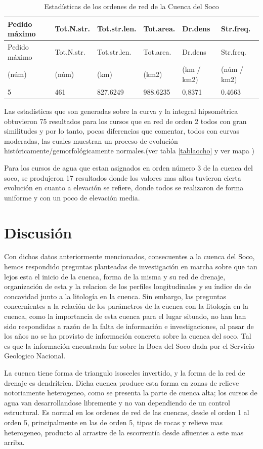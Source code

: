 \documentclass[11pt,]{article}
\begin{document}
\begin{longtable}[]{@{}llllll@{}}
\caption{\label{tablauno} Estadísticas de los ordenes de red de la
Cuenca del Soco}\tabularnewline
\toprule
Pedido máximo & Tot.N.str. & Tot.str.len. & Tot.area. & Dr.dens &
Str.freq.\tabularnewline
\midrule
\endfirsthead
\toprule
Pedido máximo & Tot.N.str. & Tot.str.len. & Tot.area. & Dr.dens &
Str.freq.\tabularnewline
\midrule
\endhead
(núm) & (núm) & (km) & (km2) & (km / km2) & (núm / km2)\tabularnewline
5 & 461 & 827.6249 & 988.6235 & 0,8371 & 0.4663\tabularnewline
\bottomrule
\end{longtable}

Las estadísticas que son generadas sobre la curva y la integral
hipsométrica obtuvieron 75 resultados para los cursos que en red de
orden 2 todos con gran similitudes y por lo tanto, pocas diferencias que
comentar, todos con curvas moderadas, las cuales muestran un proceso de
evolución históricamente/gemorfológicamente normales.(ver tabla
\ref{tablaocho} y ver mapa \label{mapados})

Para los cursos de agua que estan asignados en orden número 3 de la
cuenca del soco, se produjeron 17 resultados donde los valores mas altos
tuvieron cierta evolución en cuanto a elevación se refiere, donde todos
se realizaron de forma uniforme y con un poco de elevación media.

\section{Discusión}\label{discusiuxf3n}

Con dichos datos anteriormente mencionados, consecuentes a la cuenca del
Soco, hemos respondido preguntas planteadas de investigación en marcha
sobre que tan lejos esta el inicio de la cuenca, forma de la misma y su
red de drenaje, organización de esta y la relacion de los perfiles
longitudinales y su índice de de concavidad junto a la litología en la
cuenca. Sin embargo, las preguntas concernientes a la relación de los
parámetros de la cuenca con la litología en la cuenca, como la
importancia de esta cuenca para el lugar situado, no han han sido
respondidas a razón de la falta de información e investigaciones, al
pasar de los años no se ha provisto de información concreta sobre la
cuenca del soco. Tal es que la información encontrada fue sobre la Boca
del Soco dada por el Servicio Geologico Nacional.

La cuenca tiene forma de triangulo isosceles invertido, y la forma de la
red de drenaje es dendrítrica. Dicha cuenca produce esta forma en zonas
de relieve notoriamente heterogeneo, como se presenta la parte de cuenca
alta; los cursos de agua van desarrollandose libremente y no van
dependiendo de un control estructural. Es normal en los ordenes de red
de las cuencas, desde el orden 1 al orden 5, principalmente en las de
orden 5, tipos de rocas y relieve mas heterogeneo, producto al arrastre
de la escorrentía desde afluentes a este mas arriba.
\end{document}
